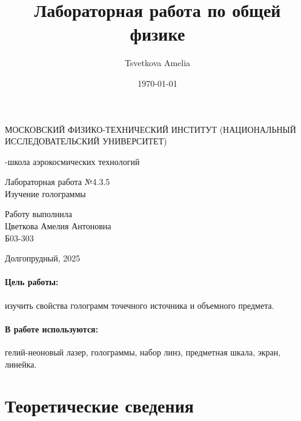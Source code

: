 \documentclass[a4paper,12pt]{article}
\author{Tsvetkova Amelia}
\title{Лабораторная работа по общей физике}
\date{\today}
\begin{document}
\begin{titlepage}
    \newpage
    \begin{center}
    {\large МОСКОВСКИЙ ФИЗИКО-ТЕХНИЧЕСКИЙ ИНСТИТУТ (НАЦИОНАЛЬНЫЙ ИССЛЕДОВАТЕЛЬСКИЙ УНИВЕРСИТЕТ)}
    \vspace{1cm}

    {-школа аэрокосмических технологий}
    \vspace{6em}
    \end{center}
    
    \vspace{1.2em}

    \begin{center}
    \Large Лабораторная работа №4.3.5 \\
    Изучение голограммы
    \linebreak
    \end{center}
    
    \vspace{11em}
    
    \begin{flushright}
                       {\large Работу выполнила\\
                       Цветкова Амелия Антоновна\\
                       Б03-303 }
    \end{flushright}

    \vspace{\fill}

    \begin{center}
    Долгопрудный, 2025
    \end{center}

    \end{titlepage}

\paragraph{Цель работы:} изучить свойства голограмм точечного источника и объемного предмета.

\paragraph{В работе используются:} гелий-неоновый лазер, голограммы, набор линз, предметная шкала, экран, линейка.

\section{Теоретические сведения}
\end{document}
